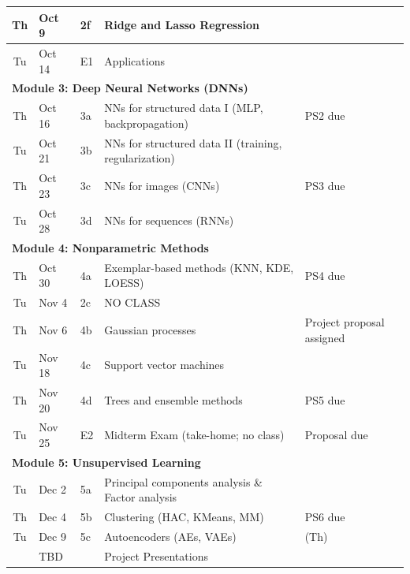 \documentclass[11pt,twoside]{article}
\numberwithin{equation}{section}
\newcommand{\?}{\stackrel{?}{=}}
\begin{document}
\begin{table}[h!]
\begin{tabular}{cllll}
Th       & Oct 9     & 2f      & Ridge and Lasso Regression                      &                             \\
\midrule
Tu     & Oct 14    & E1      & Applications                          &    \\%
\midrule
\multicolumn{4}{l}{\bf Module 3: Deep Neural Networks (DNNs)}                                                    \\\midrule
Th       & Oct 16    & 3a      & NNs for structured data I (MLP, backpropagation)             & PS2 due                             \\
Tu       & Oct 21    & 3b      & NNs for structured data II (training, regularization) &                                \\
Th       & Oct 23    & 3c      & NNs for images (CNNs)                                 &  PS3 due                              \\
Tu       & Oct 28    & 3d      & NNs for sequences (RNNs)                              &           \\
\midrule
\multicolumn{4}{l}{\bf Module 4:  Nonparametric Methods}                                                                  \\\midrule
Th       & Oct 30    & 4a      & Exemplar-based methods (KNN, KDE, LOESS)              &  PS4 due      \\
Tu       & Nov 4    & 2c      & NO CLASS                          &                     \\ 
Th       & Nov 6     & 4b      & Gaussian processes                                    & Project proposal assigned                               \\
Tu       & Nov 18    & 4c      & Support vector machines                               &                                \\
Th       & Nov 20    & 4d      & Trees and ensemble methods                            &   PS5 due            \\
\midrule
Tu       & Nov 25    &  E2     &  Midterm Exam (take-home; no class)                        &    Proposal due\\%
\midrule
\multicolumn{4}{l}{\bf Module 5: Unsupervised Learning}                                                               \\\midrule
Tu       & Dec 2     & 5a      & Principal components analysis \& Factor analysis                   &                                \\ 
Th       & Dec 4     & 5b      &  Clustering (HAC, KMeans, MM)                                  &                  PS6 due              \\
Tu       & Dec 9     & 5c      &  Autoencoders (AEs, VAEs)                             &     (Th)                    \\ \midrule
       & TBD    &         &  Project Presentations                         &                         \\ 
\bottomrule
\end{tabular}

\end{table}
 
\end{document}
